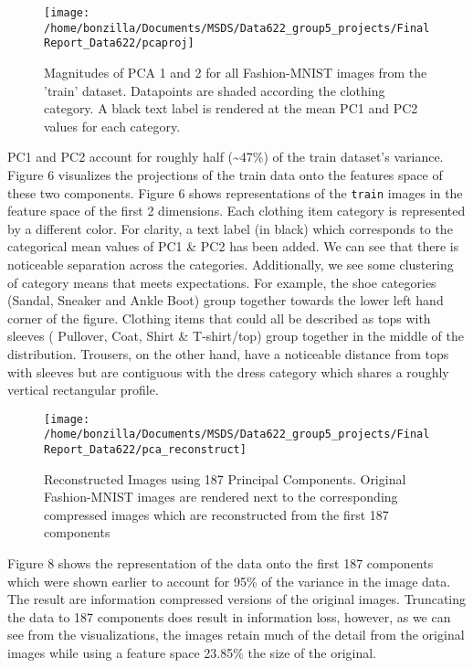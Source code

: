 \documentclass{article}
\begin{document}
\begin{figure}

{\centering \texttt{[image: /home/bonzilla/Documents/MSDS/Data622\_group5\_projects/FinalReport\_Data622/pcaproj]} 

}

\caption{Magnitudes of PCA 1 and 2 for all Fashion-MNIST images from the 'train' dataset. Datapoints are shaded according the clothing category. A black text label is rendered at the mean PC1 and PC2 values for each category.}\label{fig:unnamed-chunk-7}
\end{figure}

PC1 and PC2 account for roughly half (\textasciitilde47\%) of the train
dataset's variance. Figure 6 visualizes the projections of the train
data onto the features space of these two components. Figure 6 shows
representations of the \texttt{train} images in the feature space of the
first 2 dimensions. Each clothing item category is represented by a
different color. For clarity, a text label (in black) which corresponds
to the categorical mean values of PC1 \& PC2 has been added. We can see
that there is noticeable separation across the categories. Additionally,
we see some clustering of category means that meets expectations. For
example, the shoe categories (Sandal, Sneaker and Ankle Boot) group
together towards the lower left hand corner of the figure. Clothing
items that could all be described as tops with sleeves ( Pullover, Coat,
Shirt \& T-shirt/top) group together in the middle of the distribution.
Trousers, on the other hand, have a noticeable distance from tops with
sleeves but are contiguous with the dress category which shares a
roughly vertical rectangular profile.

\begin{figure}

{\centering \texttt{[image: /home/bonzilla/Documents/MSDS/Data622\_group5\_projects/FinalReport\_Data622/pca\_reconstruct]} 

}

\caption{Reconstructed Images using 187 Principal Components. Original Fashion-MNIST images are rendered next to the corresponding compressed images which are reconstructed from the first 187 components}\label{fig:unnamed-chunk-8}
\end{figure}

Figure 8 shows the representation of the data onto the first 187
components which were shown earlier to account for 95\% of the variance
in the image data. The result are information compressed versions of the
original images. Truncating the data to 187 components does result in
information loss, however, as we can see from the visualizations, the
images retain much of the detail from the original images while using a
feature space 23.85\% the size of the original.
\end{document}
